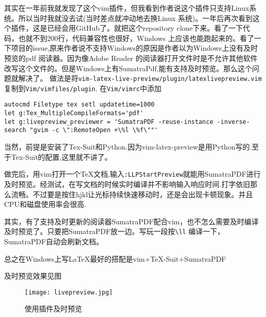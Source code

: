 \documentclass[UTF-8]{ctexart}
\begin{document}
其实在一年前我就发现了这个vim插件，但我看到作者说这个插件只支持Linux系统。所以当时我就没去试(当时差点就冲动地去换Linux 系统)。一年后再次看到这个插件，这是已经会用GitHub了。就把这个repository clone下来。看了一下代码，也就不到200行，代码兼容性也很好，Windows 上应该也能跑起来的。看了一下项目的issue,原来作者说不支持Windows的原因是作者以为Windows上没有及时预览的pdf 阅读器。因为像Adobe Reader 的阅读器打开文件时是不允许其他软件改写这个文件的。但是Windows上有SumatraPdf,能有支持及时预览。那么这个问题就解决了。
做法是将\verb!vim-latex-live-preview/plugin/latexlivepreview.vim!复制到\verb!Vim/vimfiles/plugin!.
在\verb!Vim/vimrc!中添加
\begin{lstlisting}
autocmd Filetype tex setl updatetime=1000
let g:Tex_MultipleCompileFormats='pdf'
let g:livepreview_previewer = 'SumatraPDF -reuse-instance -inverse-search "gvim -c \":RemoteOpen +\%l \%f\""'
\end{lstlisting}
当然，前提是安装了Tex-Suit和Python.因为vim-latex-preview是用Python写的.至于Tex-Suit的配置,这里就不讲了。

做完后，用vim打开一个TeX文档,输入\verb!:LLPStartPreview!就能用SumatraPDF进行及时预览。经测试，在写文档的时候实时编译并不影响输入响应时间.打字依旧那么流畅。不过要是按住hjkl让光标持续快速移动时，还是会出现卡顿现象。并且CPU和磁盘使用率会很高.


其实，有了支持及时更新的阅读器SumatraPDF配合vim，也不怎么需要及时编译及时预览了。只要把SumatraPDF放一边。写玩一段按\verb!\ll! 编译一下，SumatraPDF自动会刷新文档。

总之在Windows上写LaTeX最好的搭配是vim+TeX-Suit+SumatraPDF

及时预览效果见图
\begin{figure}[]
	\centering
	\texttt{[image: livepreview.jpg]}
	\caption{使用插件及时预览}
\end{figure}
\end{document}

